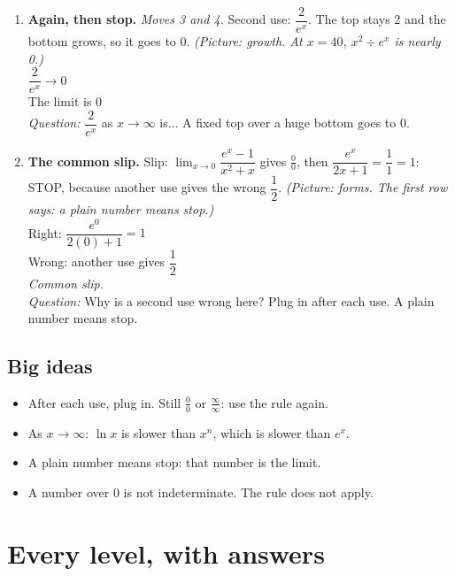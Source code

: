 \documentclass[11pt]{article}
\begin{document}
\begin{enumerate}
\item \textbf{Again, then stop.} \textit{Moves 3 and 4.} Second use: $\dfrac{2}{e^x}$. The top stays 2 and the bottom grows, so it goes to 0. \textit{(Picture: growth. At $x=40$, $x^2\div e^x$ is nearly 0.)}\\ $\dfrac{2}{e^x}\to0$\\ The limit is $0$\\ \textit{Question:} $\dfrac{2}{e^x}$ as $x\to\infty$ is...  A fixed top over a huge bottom goes to 0.
\item \textbf{The common slip.} Slip: $\displaystyle\lim_{x\to0}\dfrac{e^x-1}{x^2+x}$ gives $\frac00$, then $\dfrac{e^x}{2x+1}=\dfrac11=1$: STOP, because another use gives the wrong $\dfrac12$. \textit{(Picture: forms. The first row says: a plain number means stop.)}\\ Right: $\dfrac{e^0}{2(0)+1}=1$\\ Wrong: another use gives $\dfrac12$\\ \textit{Common slip.}\\ \textit{Question:} Why is a second use wrong here?  Plug in after each use. A plain number means stop.
\end{enumerate}
\subsection*{Big ideas}\begin{itemize}\item After each use, plug in. Still $\frac00$ or $\frac{\infty}{\infty}$: use the rule again.
\item As $x\to\infty$: $\ln x$ is slower than $x^n$, which is slower than $e^x$.
\item A plain number means stop: that number is the limit.
\item A number over 0 is not indeterminate. The rule does not apply.\end{itemize}
\section*{Every level, with answers}
\end{document}

